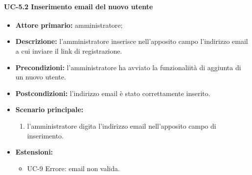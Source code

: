     \paragraph{UC-5.2 Inserimento email del nuovo utente}
    \begin{itemize}
        \item \textbf{Attore primario:} amministratore; 
    
        \item \textbf{Descrizione:} l'amministratore inserisce nell'apposito campo l'indirizzo email a cui inviare il link di registrazione.
    
        \item \textbf{Precondizioni:} l'amministratore ha avviato la funzionaliità di aggiunta di un nuovo utente.
    
        \item \textbf{Postcondizioni:} l'indirizzo email è stato correttamente inserito.
    
        \item \textbf{Scenario principale:}
              \begin{enumerate}
                  \item l'amministratore digita l'indirizzo email nell'apposito campo di inserimento.
              \end{enumerate}
        \item \textbf{Estensioni:}
              \begin{itemize}
                    \item UC-9 Errore: email non valida.
            \end{itemize}
    \end{itemize}

